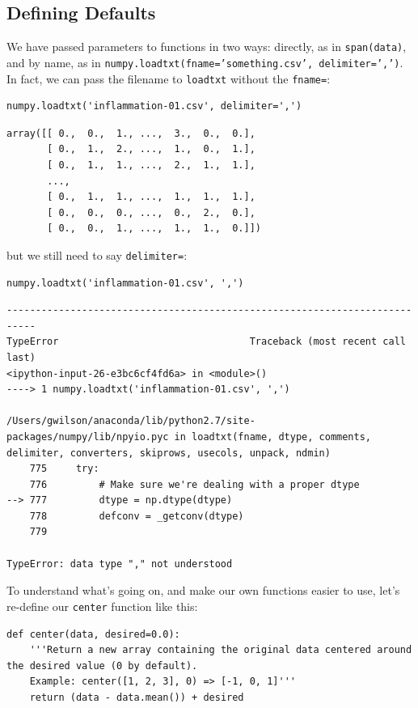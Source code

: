 \documentclass{book}
\begin{document}
\subsection{Defining Defaults}

We have passed parameters to functions in two ways: directly, as in
\texttt{span(data)}, and by name, as in
\texttt{numpy.loadtxt(fname='something.csv', delimiter=',')}. In fact,
we can pass the filename to \texttt{loadtxt} without the
\texttt{fname=}:

\begin{verbatim}
numpy.loadtxt('inflammation-01.csv', delimiter=',')
\end{verbatim}

\begin{verbatim}
array([[ 0.,  0.,  1., ...,  3.,  0.,  0.],
       [ 0.,  1.,  2., ...,  1.,  0.,  1.],
       [ 0.,  1.,  1., ...,  2.,  1.,  1.],
       ...,
       [ 0.,  1.,  1., ...,  1.,  1.,  1.],
       [ 0.,  0.,  0., ...,  0.,  2.,  0.],
       [ 0.,  0.,  1., ...,  1.,  1.,  0.]])
\end{verbatim}

but we still need to say \texttt{delimiter=}:

\begin{verbatim}
numpy.loadtxt('inflammation-01.csv', ',')
\end{verbatim}

\begin{verbatim}
---------------------------------------------------------------------------
TypeError                                 Traceback (most recent call last)
<ipython-input-26-e3bc6cf4fd6a> in <module>()
----> 1 numpy.loadtxt('inflammation-01.csv', ',')

/Users/gwilson/anaconda/lib/python2.7/site-packages/numpy/lib/npyio.pyc in loadtxt(fname, dtype, comments, delimiter, converters, skiprows, usecols, unpack, ndmin)
    775     try:
    776         # Make sure we're dealing with a proper dtype
--> 777         dtype = np.dtype(dtype)
    778         defconv = _getconv(dtype)
    779

TypeError: data type "," not understood
\end{verbatim}

To understand what's going on, and make our own functions easier to use,
let's re-define our \texttt{center} function like this:

\begin{verbatim}
def center(data, desired=0.0):
    '''Return a new array containing the original data centered around the desired value (0 by default).
    Example: center([1, 2, 3], 0) => [-1, 0, 1]'''
    return (data - data.mean()) + desired
\end{verbatim}
\end{document}
